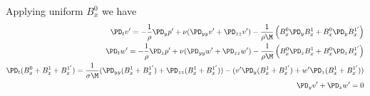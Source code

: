 \documentclass[11pt]{article}
\begin{document}
Applying uniform $B_x^0$ we have
\begin{equation}\begin{aligned}
\PD_t v' = -\frac{1}{\rho}\PD_y p' + \nu (\PD_{yy} v'+\PD_{zz} v') - \frac{1}{\rho \M} \left( B_x^0 \PD_y B_x^1 + B_x^0 \PD_y B_x^{1'} \right) \\
\PD_t w' = -\frac{1}{\rho}\PD_z p' + \nu (\PD_{yy} w'+\PD_{zz} w') - \frac{1}{\rho \M} \left( B_x^0 \PD_z B_x^1 + B_x^0 \PD_z B_x^{1'} \right) \\
\PD_t (B_x^{0}+B_x^{1}+B_x^{1'}) = \frac{1}{\sigma \M} (\PD_{yy} (B_x^{1}+B_x^{1'})+\PD_{zz} (B_x^{1}+B_x^{1'})) - (v' \PD_y (B_x^{1}+B_x^{1'}) + w'\PD_z (B_x^{1}+B_x^{1'})) \\
\PD_y v' + \PD_z w' = 0  \\
\end{aligned} \end{equation}
\end{document}

